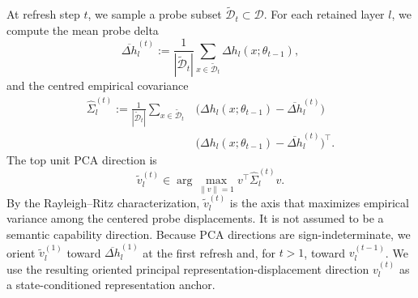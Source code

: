 At refresh step \(t\), we sample a probe subset
\(\widetilde{\mathcal D}_t\subset\mathcal D\). For each retained layer
\(l\), we compute the mean probe delta
\begin{equation}
  \overline{\Delta h}_l^{(t)}
  :=
  \frac{1}{|\widetilde{\mathcal D}_t|}
  \sum_{x\in\widetilde{\mathcal D}_t}
  \Delta h_l(x;\theta_{t-1}),
  \label{eq:anchor-delta-mean}
\end{equation}
and the centred empirical covariance
\begin{equation}
\begin{aligned}
  \widehat{\Sigma}^{(t)}_l
  :=
  \frac{1}{|\widetilde{\mathcal D}_t|}
  \sum_{x\in\widetilde{\mathcal D}_t}
  &\bigl(\Delta h_l(x;\theta_{t-1})
  -\overline{\Delta h}_l^{(t)}\bigr) \\
  &\bigl(\Delta h_l(x;\theta_{t-1})
  -\overline{\Delta h}_l^{(t)}\bigr)^\top .
\end{aligned}
\label{eq:anchor-covariance}
\end{equation}
The top unit PCA direction is
\begin{equation}
  \tilde v_l^{(t)}
  \in
  \arg\max_{\|v\|=1}
  v^\top \widehat{\Sigma}^{(t)}_l v .
  \label{eq:anchor-eigenvector}
\end{equation}
By the Rayleigh--Ritz characterization,
\(\tilde v_l^{(t)}\) is the axis that maximizes empirical variance
among the centered probe displacements. It is not assumed to be a
semantic capability direction. Because PCA directions are
sign-indeterminate, we orient \(\tilde v_l^{(1)}\) toward
\(\overline{\Delta h}_l^{(1)}\) at the first refresh and, for
\(t>1\), toward \(v_l^{(t-1)}\). We use the resulting oriented
principal representation-displacement direction \(v_l^{(t)}\) as a
state-conditioned representation anchor.

